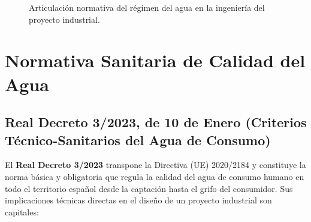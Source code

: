 \documentclass{report}
\begin{document}
\begin{figure}[H]
{

    }

    \caption{Articulación normativa del régimen del agua en la ingeniería del proyecto industrial.}

    \label{fig:jerarquia_normativa}

\end{figure}



\section{Normativa Sanitaria de Calidad del Agua}



\subsection{Real Decreto 3/2023, de 10 de Enero (Criterios Técnico-Sanitarios del Agua de Consumo)}

El \textbf{Real Decreto 3/2023} \cite{RD3_2023} transpone la Directiva (UE) 2020/2184 y constituye la norma básica y obligatoria que regula la calidad del agua de consumo humano en todo el territorio español desde la captación hasta el grifo del consumidor. Sus implicaciones técnicas directas en el diseño de un proyecto industrial son capitales:
\end{document}
